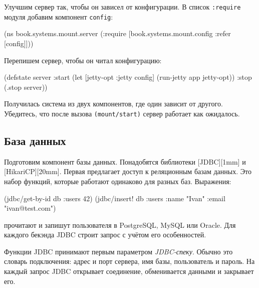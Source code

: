 
Улучшим сервер так, чтобы он зависел от конфигурации. В список \verb|:require|
модуля добавим компонент \verb|config|:

\begin{english}
  \begin{clojure}
(ns book.systems.mount.server
 (:require
  [book.systems.mount.config :refer [config]]))
  \end{clojure}
\end{english}

\noindent
Перепишем сервер, чтобы он читал конфигурацию:

\begin{english}
  \begin{clojure}
(defstate server
  :start
  (let [{jetty-opt :jetty} config]
    (run-jetty app jetty-opt))
  :stop (.stop server))
  \end{clojure}
\end{english}

Получилась система из двух компонентов, где один зависит от другого. Убедитесь,
что после вызова \verb|(mount/start)| сервер работает как ожидалось.

\subsection{База данных}


Подготовим компонент базы данных. Понадобятся библиотеки
[JDBC][1mm] и
[HikariCP][20mm]. Первая предлагает доступ
к реляционным базам данных. Это набор функций, которые работают одинаково для
разных баз. Выражения:

\begin{english}
  \begin{clojure}
(jdbc/get-by-id db :users 42)
(jdbc/insert! db :users {:name "Ivan" :email "ivan@test.com"})
  \end{clojure}
\end{english}

\noindent
прочитают и запишут пользователя в PostgreSQL, MySQL или Oracle. Для каждого
бекэнда JDBC строит запрос с учётом его особенностей.


Функции JDBC принимают первым параметром \emph{JDBC-спеку}. Обычно это словарь
подключения: адрес и порт сервера, имя базы, пользователь и пароль. На каждый
запрос JDBC открывает соединение, обменивается данными и закрывает его.

